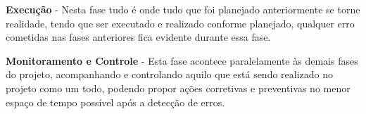 {\textbf{Execução} - Nesta fase tudo é onde tudo que foi planejado anteriormente se torne realidade, tendo que ser executado e realizado conforme planejado, qualquer erro cometidas nas fases anteriores fica evidente durante essa fase. }

{\textbf{Monitoramento e Controle} - Esta fase acontece paralelamente às demais fases do projeto, acompanhando e controlando aquilo que está sendo realizado no projeto como um todo, podendo propor ações corretivas e preventivas no menor espaço de tempo possível após a detecção de erros.}


